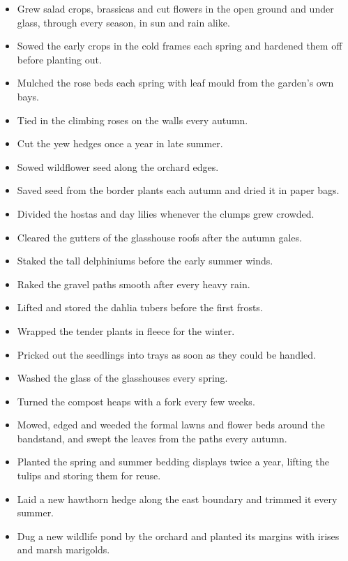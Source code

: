 \documentclass[11pt,a4paper,sans]{moderncv}
\begin{document}
{\small
\begin{itemize}
    \item Grew salad crops, brassicas and cut flowers in the open ground and under glass, through every season, in sun and rain alike.
    \item Sowed the early crops in the cold frames each spring and hardened them off before planting out.
    \item Mulched the rose beds each spring with leaf mould from the garden's own bays.
    \item Tied in the climbing roses on the walls every autumn.
    \item Cut the yew hedges once a year in late summer.
    \item Sowed wildflower seed along the orchard edges.
    \item Saved seed from the border plants each autumn and dried it in paper bags.
    \item Divided the hostas and day lilies whenever the clumps grew crowded.
    \item Cleared the gutters of the glasshouse roofs after the autumn gales.
    \item Staked the tall delphiniums before the early summer winds.
    \item Raked the gravel paths smooth after every heavy rain.
    \item Lifted and stored the dahlia tubers before the first frosts.
    \item Wrapped the tender plants in fleece for the winter.
    \item Pricked out the seedlings into trays as soon as they could be handled.
    \item Washed the glass of the glasshouses every spring.
    \item Turned the compost heaps with a fork every few weeks.
\end{itemize}\par}
\addvspace{.5em}

\vspace{3pt}

{\small
\begin{itemize}
    \item Mowed, edged and weeded the formal lawns and flower beds around the bandstand, and swept the leaves from the paths every autumn.
    \item Planted the spring and summer bedding displays twice a year, lifting the tulips and storing them for reuse.
    \item Laid a new hawthorn hedge along the east boundary and trimmed it every summer.
    \item Dug a new wildlife pond by the orchard and planted its margins with irises and marsh marigolds.
\end{itemize}\par}
\addvspace{.5em}
\end{document}

